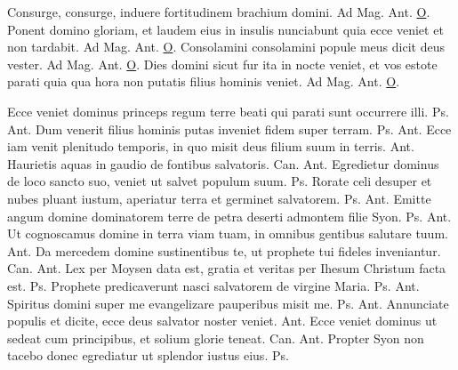 \begin{multicols*}{2}
 Consurge, consurge, induere fortitudinem brachium domini. {\color{Red} Ad Mag. Ant.} \hyperlink{o-antiphons}{O}.
 Ponent domino gloriam, et laudem eius in insulis nunciabunt quia ecce veniet et non tardabit. {\color{Red} Ad Mag. Ant.} \hyperlink{o-antiphons}{O}.
 Consolamini consolamini popule meus dicit deus vester. {\color{Red} Ad Mag. Ant.} \hyperlink{o-antiphons}{O}.
 Dies domini sicut fur ita in nocte veniet, et vos estote parati quia qua hora non putatis filius hominis veniet. {\color{Red} Ad Mag. Ant.} \hyperlink{o-antiphons}{O}.
{\color{Red} }
\par {} Ecce veniet dominus princeps regum terre beati qui parati sunt occurrere illi. {\color{Red} Ps.}  {\color{Red} Ant.} Dum venerit filius hominis putas inveniet fidem super terram. {\color{Red} Ps.}  {\color{Red} Ant.} Ecce iam venit plenitudo temporis, in quo misit deus filium suum in terris.  {\color{Red} Ant.} Haurietis aquas in gaudio de fontibus salvatoris. {\color{Red} Can.}  {\color{Red} Ant.} Egredietur dominus de loco sancto suo, veniet ut salvet populum suum. {\color{Red} Ps.} 
 Rorate celi desuper et nubes pluant iustum, aperiatur terra et germinet salvatorem. {\color{Red} Ps.}  {\color{Red} Ant.} Emitte angum domine dominatorem terre de petra deserti admontem filie Syon. {\color{Red} Ps.}  {\color{Red} Ant.} Ut cognoscamus domine in terra viam tuam, in omnibus gentibus salutare tuum.  {\color{Red} Ant.} Da mercedem domine sustinentibus te, ut prophete tui fideles inveniantur. {\color{Red} Can.}  {\color{Red} Ant.} Lex per Moysen data est, gratia et veritas per Ihesum Christum facta est. {\color{Red} Ps.} 
 Prophete predicaverunt nasci salvatorem de virgine Maria. {\color{Red} Ps.}  {\color{Red} Ant.} Spiritus domini super me evangelizare pauperibus misit me. {\color{Red} Ps.}  {\color{Red} Ant.} Annunciate populis et dicite, ecce deus salvator noster veniet.  {\color{Red} Ant.} Ecce veniet dominus ut sedeat cum principibus, et solium glorie teneat. {\color{Red} Can.}  {\color{Red} Ant.} Propter Syon non tacebo donec egrediatur ut splendor iustus eius. {\color{Red} Ps.} 

\end{multicols*}
